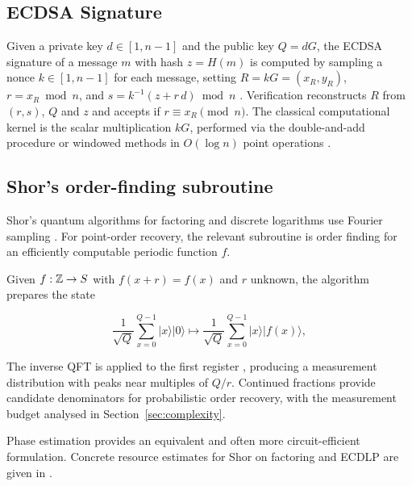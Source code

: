 \subsection{ECDSA Signature}

Given a private key $d \in [1, n-1]$ and the public key $Q = dG$, the ECDSA signature of a message $m$ with hash $z = H(m)$ is computed by sampling a nonce $k \in [1, n-1]$ for each message, setting $R = kG = (x_R, y_R)$, $r = x_R \bmod n$, and $s = k^{-1}(z + r\,d) \bmod n$ \cite{Hankerson2004, Johnson2001}. Verification reconstructs $R$ from $(r,s)$, $Q$ and $z$ and accepts if $r \equiv x_R \pmod n$. The classical computational kernel is the scalar multiplication $kG$, performed via the double-and-add procedure or windowed methods in $O(\log n)$ point operations \cite{Hankerson2004}.

\subsection{Shor's order-finding subroutine}

\begin{revision}
Shor's quantum algorithms for factoring and discrete logarithms use Fourier sampling \cite{Shor1994,Shor1997}. For point-order recovery, the relevant subroutine is order finding for an efficiently computable periodic function $f$. \end{revision}

Given $f: \mathbb{Z} \to S$ with $f(x+r) = f(x)$ and $r$ unknown, the algorithm prepares the state

\begin{equation}
    \frac{1}{\sqrt{Q}}\sum_{x=0}^{Q-1} \lvert x\rangle \lvert 0\rangle \longmapsto
    \frac{1}{\sqrt{Q}}\sum_{x=0}^{Q-1} \lvert x\rangle \lvert f(x)\rangle,
\end{equation}

\begin{revision}
The inverse QFT is applied to the first register \cite{Coppersmith1994,NielsenChuang2010}, producing a measurement distribution with peaks near multiples of $Q/r$. Continued fractions \cite{HardyWright2008} provide candidate denominators for probabilistic order recovery, with the measurement budget analysed in Section~\ref{sec:complexity}. \end{revision}Phase estimation \cite{Kitaev1995, Cleve1998} provides an equivalent and often more circuit-efficient formulation. Concrete resource estimates for Shor on factoring and ECDLP are given in \cite{Beauregard2003, Roetteler2017, Gidney2021, Haner2020}.

